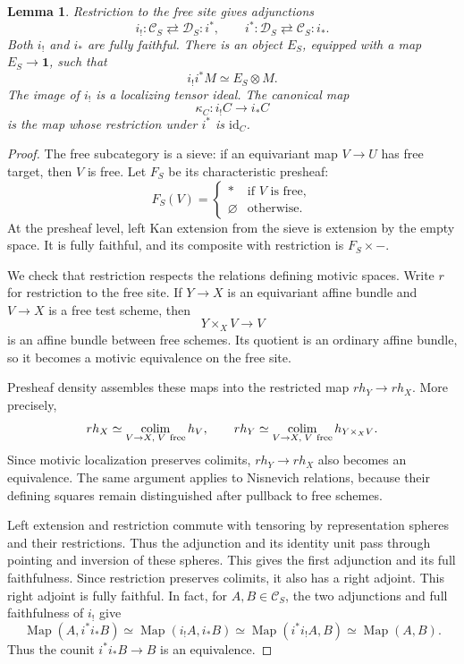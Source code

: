 \documentclass[11pt,reqno]{amsart}
\newtheorem{lemma}[theorem]{Lemma}
\theoremstyle{definition}
\theoremstyle{remark}
\theoremstyle{plain}
\numberwithin{equation}{section}
\newcommand{\one}{\mathbf 1}
\DeclareMathOperator{\Map}{Map}
\begin{document}
\begin{lemma}\label{lem:free-embeddings}
Restriction to the free site gives adjunctions
\[
 i_!:\mathcal C_S\rightleftarrows\mathcal D_S:i^*,
 \qquad
 i^*:\mathcal D_S\rightleftarrows\mathcal C_S:i_*.
\]
Both \(i_!\) and \(i_*\) are fully faithful.
There is an object \(E_S\), equipped with a map \(E_S\to\one\), such that
\[
 i_!i^*M\simeq E_S\otimes M.
\]
The image of \(i_!\) is a localizing tensor ideal.
The canonical map
\[
 \kappa_C:i_!C\longrightarrow i_*C
\]
is the map whose restriction under \(i^*\) is \(\mathrm{id}_C\).
\end{lemma}

\begin{proof}
The free subcategory is a sieve: if an equivariant map \(V\to U\)
has free target, then \(V\) is free.
Let \(F_S\) be its characteristic presheaf:
\[
 F_S(V)=
 \begin{cases}
 *&\text{if \(V\) is free},\\
 \varnothing&\text{otherwise}.
 \end{cases}
\]
At the presheaf level, left Kan extension from the sieve is extension
by the empty space.
It is fully faithful, and its composite with restriction is
\(F_S\times-\).

We check that restriction respects the relations defining motivic spaces.
Write \(r\) for restriction to the free site.
If \(Y\to X\) is an equivariant affine bundle and \(V\to X\) is a
free test scheme, then
\[
 Y\times_XV\longrightarrow V
\]
is an affine bundle between free schemes.
Its quotient is an ordinary affine bundle, so it becomes a
motivic equivalence on the free site.

Presheaf density assembles these maps into the restricted map
\(rh_Y\to rh_X\). More precisely,
\[
 rh_X\simeq\operatorname*{colim}_{V\to X,\;V\ {\rm free}}h_V,
 \qquad
 rh_Y\simeq\operatorname*{colim}_{V\to X,\;V\ {\rm free}}
 h_{Y\times_XV}.
\]
Since motivic localization preserves colimits, \(rh_Y\to rh_X\)
also becomes an equivalence.
The same argument applies to Nisnevich relations, because their
defining squares remain distinguished after pullback to free schemes.


Left extension and restriction commute with tensoring by representation
spheres and their restrictions.
Thus the adjunction and its identity unit pass through pointing and
inversion of these spheres.
This gives the first adjunction and its full faithfulness.
Since restriction preserves colimits, it also has a right adjoint.
This right adjoint is fully faithful. In fact, for \(A,B\in\mathcal C_S\),
the two adjunctions and full faithfulness of \(i_!\) give
\[
 \Map(A,i^*i_*B)
 \simeq\Map(i_!A,i_*B)
 \simeq\Map(i^*i_!A,B)
 \simeq\Map(A,B).
\]
Thus the counit \(i^*i_*B\to B\) is an equivalence.


\end{proof}
\end{document}
